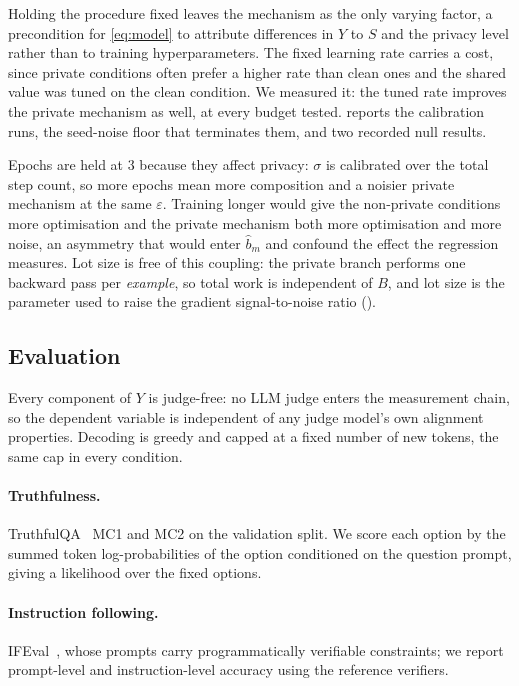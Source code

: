 Holding the procedure fixed leaves the mechanism as the only varying factor, a precondition for \eqref{eq:model} to attribute differences in $Y$ to $S$ and the privacy level rather than to training hyperparameters.
The fixed learning rate carries a cost, since private conditions often prefer a higher rate than clean ones and the shared value was tuned on the clean condition.
We measured it: the tuned rate improves the private mechanism as well, at every budget tested.
 reports the calibration runs, the seed-noise floor that terminates them, and two recorded null results.

Epochs are held at $3$ because they affect privacy: $\sigma$ is calibrated over the total step count, so more epochs mean more composition and a noisier private mechanism at the same $\varepsilon$.
Training longer would give the non-private conditions more optimisation and the private mechanism both more optimisation and more noise, an asymmetry that would enter $\hat b_m$ and confound the effect the regression measures.
Lot size is free of this coupling: the private branch performs one backward pass per \textit{example}, so total work is independent of $B$, and lot size is the parameter used to raise the gradient signal-to-noise ratio ().

\subsection{\label{sec:eval}Evaluation}
Every component of $Y$ is judge-free:
no LLM judge enters the measurement chain,
so the dependent variable is independent of any judge model's own alignment properties.
Decoding is greedy and capped at a fixed number of new tokens, the same cap in every condition.

\paragraph{Truthfulness.}
TruthfulQA~\citep{lin2022truthfulqa} MC1 and MC2 on the validation split.
We score each option by the summed token log-probabilities of the option conditioned on the question prompt, giving a likelihood over the fixed options.

\paragraph{Instruction following.}
IFEval~\citep{zhou2023instruction},
whose prompts carry programmatically verifiable constraints;
we report prompt-level and instruction-level accuracy using the reference verifiers.

